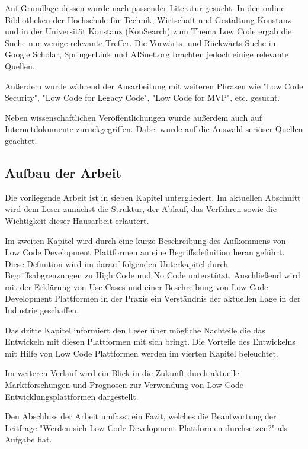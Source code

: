 \documentclass[12pt]{article} %
\begin{document}
	Auf Grundlage dessen wurde nach passender Literatur gesucht. In den online-Bibliotheken der Hochschule für Technik, Wirtschaft und Gestaltung Konstanz und in der Universität Konstanz (KonSearch) zum Thema Low Code ergab die Suche nur wenige relevante Treffer. Die Vorwärts- und Rückwärts-Suche in Google Scholar, SpringerLink und AISnet.org brachten jedoch einige relevante Quellen. 
	
	Außerdem wurde während der Ausarbeitung mit weiteren Phrasen wie "Low Code Security", "Low Code for Legacy Code", "Low Code for MVP", etc. gesucht. \newline 
	 
	Neben wissenschaftlichen Veröffentlichungen wurde außerdem auch auf Internetdokumente zurückgegriffen. Dabei wurde auf die Auswahl seriöser Quellen geachtet.
	
	\subsection{Aufbau der Arbeit}
	Die vorliegende Arbeit ist in sieben Kapitel untergliedert. Im aktuellen Abschnitt wird dem Leser zunächst die Struktur, der Ablauf, das Verfahren sowie die Wichtigkeit dieser Hausarbeit erläutert. \newline
	
	Im zweiten Kapitel wird durch eine kurze Beschreibung des Aufkommens von Low Code Development Plattformen an eine Begriffsdefinition heran geführt. Diese Definition wird im darauf folgenden Unterkapitel durch Begriffsabgrenzungen zu High Code und No Code unterstützt. Anschließend wird mit der Erklärung von Use Cases und einer Beschreibung von Low Code Development Plattformen in der Praxis ein Verständnis der aktuellen Lage in der Industrie geschaffen. \newline
	
	Das dritte Kapitel informiert den Leser über mögliche Nachteile die das Entwickeln mit diesen Plattformen mit sich bringt. 
	Die Vorteile des Entwickelns mit Hilfe von Low Code Plattformen werden im vierten Kapitel beleuchtet. \newline
	
	Im weiteren Verlauf wird ein Blick in die Zukunft durch aktuelle Marktforschungen und Prognosen zur Verwendung von Low Code Entwicklungsplattformen dargestellt. 
	
	Den Abschluss der Arbeit umfasst ein Fazit, welches die Beantwortung der Leitfrage "Werden sich Low Code Development Plattformen durchsetzen?" als Aufgabe hat. 
	
\end{document}
